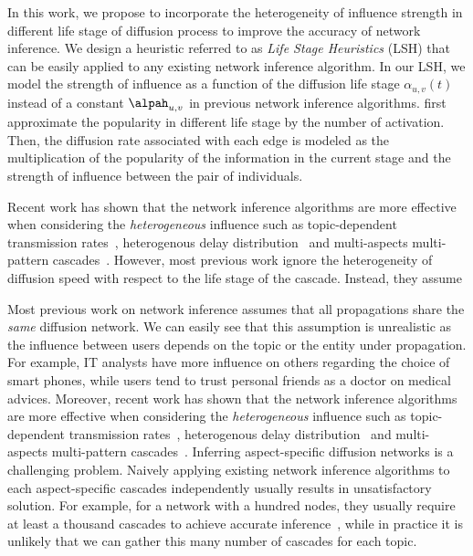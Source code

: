 In this work, we propose to incorporate the heterogeneity of influence strength in different life stage of diffusion process to improve the accuracy of network inference. We design a heuristic referred to as \emph{Life Stage Heuristics} (LSH) that can be easily applied to any existing network inference algorithm. In our LSH, we model the strength of influence as a function of the diffusion life stage $\alpha_{u,v}(t)$ instead of a constant $\alpah_{u,v}$ in previous network inference algorithms.  first approximate the popularity in different life stage by the number of activation. Then, the diffusion rate associated with each edge is  modeled as the multiplication of the popularity of the information in the current stage and the strength of influence between the pair of individuals.     

Recent work has shown that the network inference algorithms are more effective when considering the \emph{heterogeneous} influence such as topic-dependent transmission rates~\cite{Du:Song:Woo:Zha:topicCascade}, heterogenous delay distribution~\cite{Du:Song:Song:Alex:HeterogeneousInf} and multi-aspects multi-pattern cascades~\cite{Wang:Hu:Philip:Li:multiAspect}. However, most previous work ignore the heterogeneity of diffusion speed with respect to the life stage of the cascade. Instead, they assume 

 
Most previous work on network inference assumes that all propagations share the \emph{same} diffusion network. We can easily see that this assumption is unrealistic as the influence between users depends on the topic or the entity under propagation. For example, IT analysts have more influence on others regarding the choice of smart phones, while users tend to trust personal friends as a doctor on medical advices. Moreover, recent work has shown that the network inference algorithms are more effective when considering the \emph{heterogeneous} influence such as topic-dependent transmission rates~\cite{Du:Song:Woo:Zha:topicCascade}, heterogenous delay distribution~\cite{Du:Song:Song:Alex:HeterogeneousInf} and multi-aspects multi-pattern cascades~\cite{Wang:Hu:Philip:Li:multiAspect}. Inferring aspect-specific diffusion networks is a challenging problem.  Naively applying existing network inference algorithms to each aspect-specific cascades independently usually results in unsatisfactory solution. For example, for a network with a hundred nodes, they usually require at least a thousand cascades to achieve accurate inference~\cite{gomez-rodriguez:leskovec:krause:inferring}, while in practice it is unlikely that we can gather this many number of cascades for each topic. 